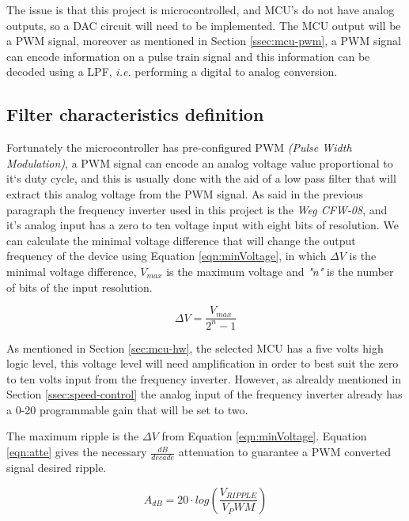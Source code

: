 		The issue is that this project is microcontrolled, and MCU's do not have analog outputs, so a DAC circuit will need to be implemented. The MCU output will be a PWM signal, moreover as mentioned in Section \ref{ssec:mcu-pwm}, a PWM signal can encode information on a pulse train signal and this information can be decoded using a LPF, \textit{i.e.} performing a digital to analog conversion.

	\subsection{Filter characteristics definition}\label{ssec:filterCharacteristicsDefinition}
		\par
		Fortunately the microcontroller has pre-configured PWM \textit{(Pulse Width Modulation)}, a PWM signal can encode an analog voltage value proportional to it`s duty cycle, and this is usually done with the aid of a low pass filter that will extract this analog voltage from the PWM signal. As said in the previous paragraph the frequency inverter used in this project is the \textit{Weg CFW-08}, and it's analog input has a zero to ten voltage input with eight bits of resolution. We can calculate the minimal voltage difference that will change the output frequency of the device using Equation \ref{eqn:minVoltage}, in which $\Delta V$ is the minimal voltage difference, $V_{max}$ is the maximum voltage and \textit{"n"} is the number of bits of the input resolution.

			\begin{equation}\label{eqn:minVoltage}
				\Delta V=\frac{V_{max}}{2^{n} - 1}
			\end{equation}
	
		As mentioned in Section \ref{sec:mcu-hw}, the selected MCU has a five volts high logic level, this voltage level will need amplification in order to best suit the zero to ten volts input from the frequency inverter. However, as alrealdy mentioned in Section \ref{ssec:speed-control} the analog input of the frequency inverter already has a 0-20 programmable gain that will be set to two. 
		\par
		The maximum ripple is the $\Delta V$ from Equation \ref{eqn:minVoltage}. Equation \ref{eqn:atte} \cite{metivier2013pwm} gives the necessary $\frac{dB}{decade}$ attenuation to guarantee a PWM converted signal desired ripple.

	 		\begin{equation}\label{eqn:atte}
				A_{dB}=20\cdot log \left( \frac{V_{RIPPLE}}{V_PWM} \right) 
			\end{equation}
			
